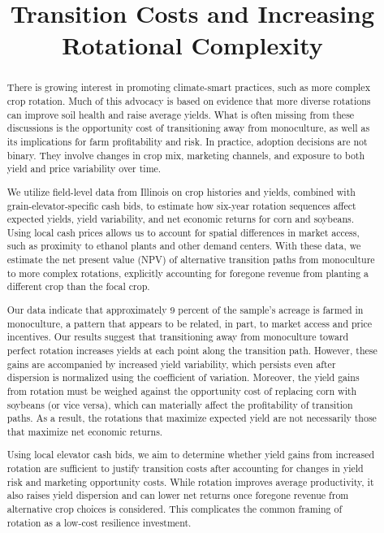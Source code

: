 \documentclass[12pt]{article}
\title{Transition Costs and Increasing Rotational Complexity}
\author{}
\date{}
\begin{document}
\maketitle

\begin{abstract}

There is growing interest in promoting climate-smart practices, such as more complex crop rotation. Much of this advocacy is based on evidence that more diverse rotations can improve soil health and raise average yields. What is often missing from these discussions is the opportunity cost of transitioning away from monoculture, as well as its implications for farm profitability and risk. In practice, adoption decisions are not binary. They involve changes in crop mix, marketing channels, and exposure to both yield and price variability over time.

We utilize field-level data from Illinois on crop histories and yields, combined with grain-elevator-specific cash bids, to estimate how six-year rotation sequences affect expected yields, yield variability, and net economic returns for corn and soybeans. Using local cash prices allows us to account for spatial differences in market access, such as proximity to ethanol plants and other demand centers. With these data, we estimate the net present value (NPV) of alternative transition paths from monoculture to more complex rotations, explicitly accounting for foregone revenue from planting a different crop than the focal crop.

Our data indicate that approximately 9 percent of the sample’s acreage is farmed in monoculture, a pattern that appears to be related, in part, to market access and price incentives. Our results suggest that transitioning away from monoculture toward perfect rotation increases yields at each point along the transition path. However, these gains are accompanied by increased yield variability, which persists even after dispersion is normalized using the coefficient of variation. Moreover, the yield gains from rotation must be weighed against the opportunity cost of replacing corn with soybeans (or vice versa), which can materially affect the profitability of transition paths. As a result, the rotations that maximize expected yield are not necessarily those that maximize net economic returns.

Using local elevator cash bids, we aim to determine whether yield gains from increased rotation are sufficient to justify transition costs after accounting for changes in yield risk and marketing opportunity costs. While rotation improves average productivity, it also raises yield dispersion and can lower net returns once foregone revenue from alternative crop choices is considered. This complicates the common framing of rotation as a low-cost resilience investment.


\end{abstract}
\end{document}
